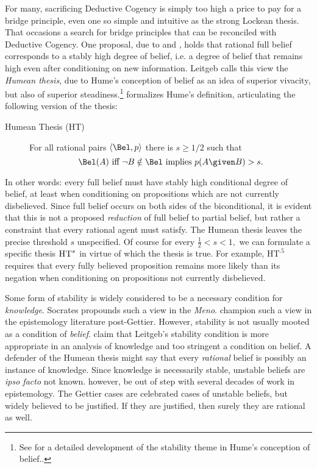 For many, sacrificing Deductive Cogency is simply too high a price to pay for a
bridge principle, even one so simple and intuitive as the strong Lockean thesis.
That occasions a search for bridge principles that can be reconciled with
Deductive Cogency. One proposal, due to
\citet{leitgeb2013reducing,leitgeb2014stability,leitgeb2015humean,leitgeb2017stability}
and \citet{arlo2012belief}, holds that rational full belief corresponds to a
stably high degree of belief, i.e. a degree of belief that remains high even
after conditioning on new information. Leitgeb calls this view the {\em Humean
thesis}, due to Hume's conception of belief as an idea of superior vivacity, but
also of superior steadiness.\footnote{See \citet{loeb2002stability,
loeb2010reflection} for a detailed development of the stability theme in Hume's
conception of belief..} \citet{leitgeb2017stability} formalizes Hume's
definition, articulating the following version of the thesis:
\begin{description}
\item[Humean Thesis (HT)] For all rational pairs  $\langle \Bel, p \rangle$
there is $s\geq 1/2$ such that $$\Bel(A) \text{ iff } \neg B \notin \Bel \text{
implies } p(A \given B)> s.$$
\end{description}
In other words: every full belief must have stably high conditional degree of
belief, at least when conditioning on propositions which are not currently
disbelieved. Since full belief occurs on both sides of the biconditional, it is
evident that this is not a proposed {\em reduction} of full belief to partial
belief, but rather a constraint that every rational agent must satisfy. The
Humean thesis leaves the precise threshold $s$ unspecified. Of course for every
$\frac{1}{2}< s<1,$ we can formulate a specific thesis $\textsc{HT}^s$ in virtue
of which the thesis is true. For example, $\text{HT}^{.5}$ requires that every
fully believed proposition remains more likely than its negation when
conditioning on propositions not currently disbelieved.

Some form of stability is widely considered to be a necessary condition for {\em
knowledge}. Socrates propounds such a view in the {\em Meno}.
\citet{paxson1969knowledge} champion such a view in the epistemology literature
post-Gettier. However, stability is not usually mooted as a condition of {\em
belief}. \citet{raidl2017bridging} claim that Leitgeb's stability condition is
more appropriate in an analysis of knowledge and too stringent a condition on
belief. A defender of the Humean thesis might say that every {\em rational}
belief is possibly an instance of knowledge. Since knowledge is necessarily
stable, unstable beliefs are {\em ipso facto} not known.%
however, be out of step with several decades of work in epistemology. The
Gettier cases are celebrated cases of unstable beliefs, but widely believed to
be justified. If they are justified, then surely they are rational as well.

